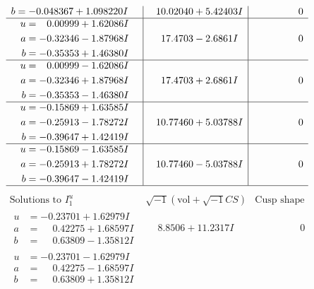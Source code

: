 \documentclass[1p]{elsarticle_modified}
\theoremstyle{definition}
\newcommand{\I}{\sqrt{-1}}
\begin{document}
$$\begin{array}{c|c|c}
\begin{aligned}
b &= -0.048367 + 1.098220 I\end{aligned}
 & \phantom{-}10.02040 + 5.42403 I & \phantom{-0.000000 } 0 \\ \hline\begin{aligned}
u &= \phantom{-}0.00999 + 1.62086 I \\
a &= -0.32346 - 1.87968 I \\
b &= -0.35353 + 1.46380 I\end{aligned}
 & \phantom{-}17.4703 - 2.6861 I & \phantom{-0.000000 } 0 \\ \hline\begin{aligned}
u &= \phantom{-}0.00999 - 1.62086 I \\
a &= -0.32346 + 1.87968 I \\
b &= -0.35353 - 1.46380 I\end{aligned}
 & \phantom{-}17.4703 + 2.6861 I & \phantom{-0.000000 } 0 \\ \hline\begin{aligned}
u &= -0.15869 + 1.63585 I \\
a &= -0.25913 - 1.78272 I \\
b &= -0.39647 + 1.42419 I\end{aligned}
 & \phantom{-}10.77460 + 5.03788 I & \phantom{-0.000000 } 0 \\ \hline\begin{aligned}
u &= -0.15869 - 1.63585 I \\
a &= -0.25913 + 1.78272 I \\
b &= -0.39647 - 1.42419 I\end{aligned}
 & \phantom{-}10.77460 - 5.03788 I & \phantom{-0.000000 } 0\\
 \hline 
 \end{array}$$\newpage$$\begin{array}{c|c|c}  
\text{Solutions to }I^u_{1}& \I (\text{vol} + \sqrt{-1}CS) & \text{Cusp shape}\\
 \hline 
\begin{aligned}
u &= -0.23701 + 1.62979 I \\
a &= \phantom{-}0.42275 + 1.68597 I \\
b &= \phantom{-}0.63809 - 1.35812 I\end{aligned}
 & \phantom{-}8.8506 + 11.2317 I & \phantom{-0.000000 } 0 \\ \hline\begin{aligned}
u &= -0.23701 - 1.62979 I \\
a &= \phantom{-}0.42275 - 1.68597 I \\
b &= \phantom{-}0.63809 + 1.35812 I\end{aligned}

\end{array}$$
\end{document}

